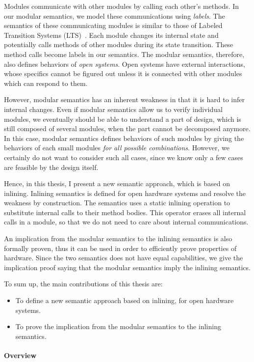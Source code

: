 Modules communicate with other modules by calling each other's
methods. In our modular semantics, we model these communications using
\emph{labels}. The semantics of these communicating modules is similar
to those of Labeled Transition Systems (LTS)~\cite{lts}. Each module
changes its internal state and potentially calls methods of other
modules during its state transition. These method calls become labels
in our semantics.  The modular semantics, therefore, also defines
behaviors of \emph{open systems}. Open systems have external
interactions, whose specifics cannot be figured out unless it is
connected with other modules which can respond to them.

However, modular semantics has an inherent weakness in that it is hard
to infer internal changes. Even if modular semantics allow us to
verify individual modules, we eventually should be able to understand
a part of design, which is still composed of several modules, when the
part cannot be decomposed anymore. In this case, modular semantics
defines behaviors of such modules by giving the behaviors of each
small modules \emph{for all possible combinations}. However, we
certainly do not want to consider such all cases, since we know only a
few cases are feasible by the design itself.

Hence, in this thesis, I present a new semantic approach, which is
based on inlining. Inlining semantics is defined for open hardware
systems and resolve the weakness by construction. The semantics uses a
static inlining operation to substitute internal calls to their method
bodies. This operator erases all internal calls in a module, so that
we do not need to care about internal communications.

An implication from the modular semantics to the inlining semantics is
also formally proven, thus it can be used in order to efficiently
prove properties of hardware. Since the two semantics does not have
equal capabilities, we give the implication proof saying that the
modular semantics imply the inlining semantics.

To sum up, the main contributions of this thesis are:
\begin{itemize}
\item To define a new semantic approach based on inlining, for open
  hardware systems.
\item To prove the implication from the modular semantics to the
  inlining semantics.
\end{itemize}

\paragraph{Overview}

